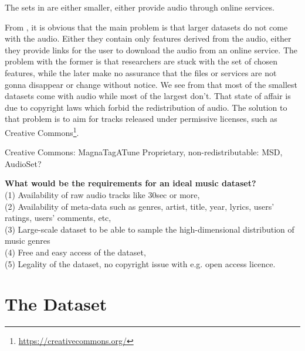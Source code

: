 \documentclass{article}
\begin{document}

The sets in  are either smaller, either provide audio through online services.

From , it is obvious that the main problem is that larger datasets do not come with the audio. Either they contain only features derived from the audio, either they provide links for the user to download the audio from an online service. The problem with the former is that researchers are stuck with the set of chosen features, while the later make no assurance that the files or services are not gonna disappear or change without notice.
We see from  that most of the smallest datasets come with audio while most of the largest don't. That state of affair is due to copyright laws which forbid the redistribution of audio. The solution to that problem is to aim for tracks released under permissive licenses, such as Creative Commons\footnote{\url{https://creativecommons.org/}}.

Creative Commons: MagnaTagATune
Proprietary, non-redistributable: MSD, AudioSet?

\noindent
{\bf What would be the requirements for an ideal music dataset?}  \\
(1) Availability of raw audio tracks like 30sec or more,\\
(2) Availability of meta-data such as genres, artist, title, year, lyrics, users' ratings, users' comments, etc,\\
(3) Large-scale dataset to be able to sample the high-dimensional distribution of music genres\\
(4) Free and easy access of the dataset,\\
(5) Legality of the dataset, no copyright issue with e.g. open access licence.\\





\section{The Dataset} %
\end{document}
